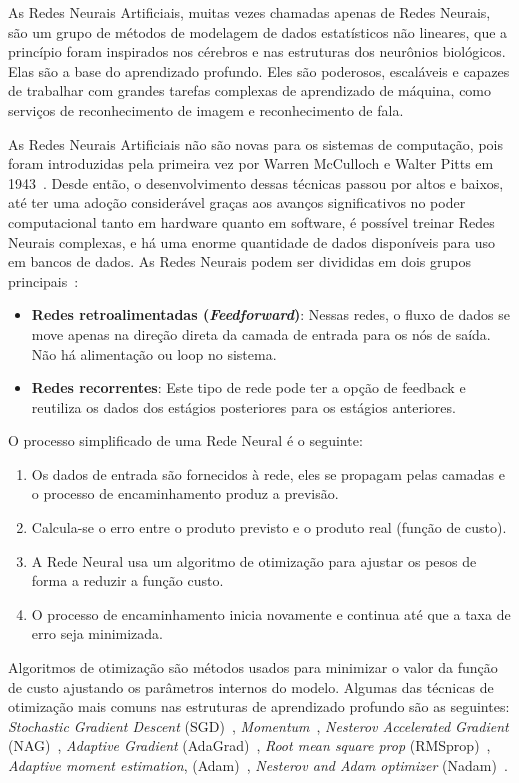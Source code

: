 \documentclass[portugues]{ic-tese}
\begin{document}
As Redes Neurais Artificiais, muitas vezes chamadas apenas de Redes Neurais, são um grupo de métodos de modelagem de dados estatísticos não lineares, que a princípio foram inspirados nos cérebros e nas estruturas dos neurônios biológicos. Elas são a base do aprendizado profundo. Eles são poderosos, escaláveis e capazes de trabalhar com grandes tarefas complexas de aprendizado de máquina, como serviços de reconhecimento de imagem e reconhecimento de fala.

As Redes Neurais Artificiais não são novas para os sistemas de computação, pois foram introduzidas pela primeira vez por Warren McCulloch e Walter Pitts em 1943~\citep{McCulloch_1943}. Desde então, o desenvolvimento dessas técnicas passou por altos e baixos, até ter uma adoção considerável graças aos avanços significativos no poder computacional tanto em hardware quanto em software, é possível treinar Redes Neurais complexas, e há uma enorme quantidade de dados disponíveis para uso em bancos de dados. As Redes Neurais podem ser divididas em dois grupos principais~\citep{Singh_2009}:

\begin{itemize}
\item \textbf{Redes retroalimentadas (\textit{Feedforward})}: Nessas redes, o fluxo de dados se move apenas na direção direta da camada de entrada para os nós de saída. Não há alimentação ou loop no sistema.
\item \textbf{Redes recorrentes}: Este tipo de rede pode ter a opção de feedback e reutiliza os dados dos estágios posteriores para os estágios anteriores.
\end{itemize}

O processo simplificado de uma Rede Neural é o seguinte:

\begin{enumerate}[label=\textbf{\arabic*.}]
\item Os dados de entrada são fornecidos à rede, eles se propagam pelas camadas e o processo de encaminhamento produz a previsão.
\item Calcula-se o erro entre o produto previsto e o produto real (função de custo).
\item A Rede Neural usa um algoritmo de otimização para ajustar os pesos de forma a reduzir a função custo.
\item O processo de encaminhamento inicia novamente e continua até que a taxa de erro seja minimizada.
\end{enumerate}

Algoritmos de otimização são métodos usados para minimizar o valor da função de custo ajustando os parâmetros internos do modelo. Algumas das técnicas de otimização mais comuns nas estruturas de aprendizado profundo são as seguintes: \textit{Stochastic Gradient Descent} (SGD)~\citep{Schmidt_2013}, \textit{Momentum}~\citep{Polyak_1964}, \textit{Nesterov Accelerated Gradient} (NAG)~\citep{Sutskever_2013}, \textit{Adaptive Gradient} (AdaGrad)~\citep{Duchi_2011}, \textit{Root mean square prop} (RMSprop)~\citep{Graves_2013}, \textit{Adaptive moment estimation}, (Adam)~\citep{Kingma_2014}, \textit{Nesterov and Adam optimizer} (Nadam)~\citep{Dozat_2016}.
\end{document}
